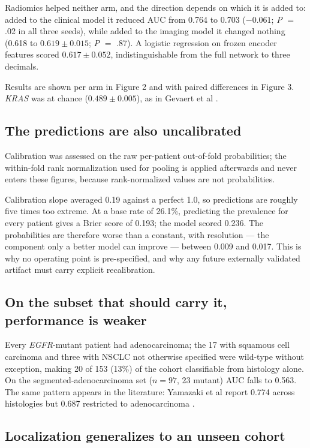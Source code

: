 \documentclass[11pt]{article}
\begin{document}
Radiomics helped neither arm, and the direction depends on which it is added to:
added to the clinical model it reduced AUC from 0.764 to 0.703 ($-0.061$;
\textit{P} $=$ .02 in all three seeds), while added to the imaging model it
changed nothing (0.618 to $0.619 \pm 0.015$; \textit{P} $=$ .87). A logistic
regression on frozen encoder features scored $0.617 \pm 0.052$, indistinguishable
from the full network to three decimals.

Results are shown per arm in Figure 2 and with paired differences in Figure 3.
\textit{KRAS} was at chance ($0.489 \pm 0.005$), as in Gevaert et al
\citep{gevaert2017}.

\subsection*{The predictions are also uncalibrated}

Calibration was assessed on the raw per-patient out-of-fold probabilities; the
within-fold rank normalization used for pooling is applied afterwards and never
enters these figures, because rank-normalized values are not probabilities.

Calibration slope averaged 0.19 against a perfect 1.0, so predictions are roughly
five times too extreme. At a base rate of 26.1\%, predicting the prevalence for
every patient gives a Brier score of 0.193; the model scored 0.236. The
probabilities are therefore worse than a constant, with resolution --- the
component only a better model can improve --- between 0.009 and 0.017. This is why
no operating point is pre-specified, and why any future externally validated
artifact must carry explicit recalibration.

\subsection*{On the subset that should carry it, performance is weaker}

Every \textit{EGFR}-mutant patient had adenocarcinoma; the 17 with squamous cell
carcinoma and three with NSCLC not otherwise specified were wild-type without
exception, making 20 of 153 (13\%) of the cohort classifiable from histology alone.
On the segmented-adenocarcinoma set ($n = 97$, 23 mutant) AUC falls to 0.563. The
same pattern appears in the literature: Yamazaki et al report 0.774 across
histologies but 0.687 restricted to adenocarcinoma \citep{yamazaki2022}.

\subsection*{Localization generalizes to an unseen cohort}
\end{document}
